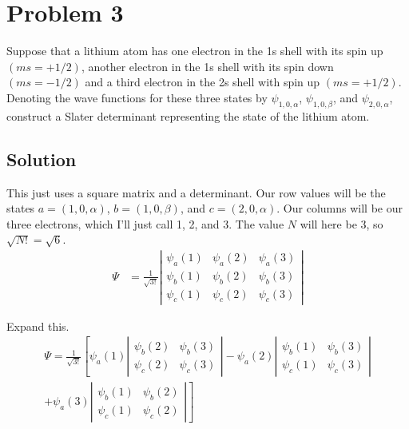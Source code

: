 \documentclass[12pt]{article}
\begin{document}
    \section{Problem 3}
        Suppose that a lithium atom has one electron in the 1s shell with its spin up $(ms = +1/2)$, another electron in the 1s shell with its spin down $(ms = -1/2)$ and a third electron in the 2s shell with spin up $(ms = + 1/2)$. 
        Denoting the wave functions for these three states by $\psi_{1,0,\alpha}$, $\psi_{1,0,\beta}$, and $\psi_{2,0,\alpha}$, construct a Slater determinant representing the state of the lithium atom.

        \subsection{Solution}
            This just uses a square matrix and a determinant.
            Our row values will be the states $a = (1,0,\alpha)$, $b = (1,0,\beta)$, and $c = (2,0,\alpha)$.
            Our columns will be our three electrons, which I'll just call 1, 2, and 3.
            The value $N$ will here be 3, so $\sqrt{N!} = \sqrt{6}$.
            \begin{align}
                \Psi    &=  \frac{1}{\sqrt{3!}} \left| \begin{matrix}
                    \psi_{a}(1) &\psi_{a}(2)    &\psi_{a}(3) \\
                    \psi_{b}(1) &\psi_{b}(2)    &\psi_{b}(3) \\
                    \psi_{c}(1) &\psi_{c}(2)    &\psi_{c}(3)
                \end{matrix} \right|
            \end{align}

            Expand this.
            \begin{multline}
                \Psi    =   \frac{1}{\sqrt{3!}} \left[ \psi_{a}(1) \left| \begin{matrix}
                            \psi_{b}(2) &\psi_{b}(3)  \\
                            \psi_{c}(2) &\psi_{c}(3)
                        \end{matrix} \right|\right.
                        -   \psi_{a}(2) \left| \begin{matrix}
                                \psi_{b}(1) &\psi_{b}(3)  \\
                                \psi_{c}(1) &\psi_{c}(3)
                            \end{matrix} \right|\\
                        +   \left.\psi_{a}(3) \left| \begin{matrix}
                                \psi_{b}(1) &\psi_{b}(2)  \\
                                \psi_{c}(1) &\psi_{c}(2)
                            \end{matrix} \right| \right]
            \end{multline}
\end{document}
